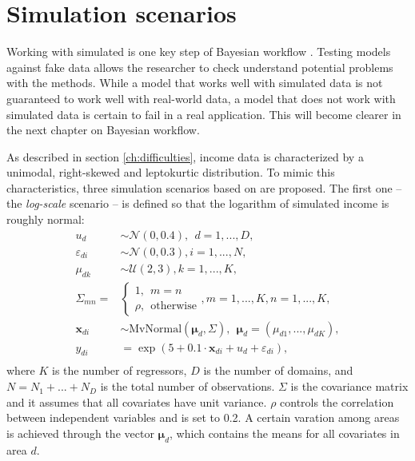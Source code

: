 \section{Simulation scenarios}
\label{ch:simulations}
Working with simulated is one key step of Bayesian workflow \cite{gelman_bayesian_2020}.
Testing models against fake data allows the researcher to check understand potential problems with the methods.
While a model that works well with simulated data is not guaranteed to work well with real-world data,
a model that does not work with simulated data is certain to fail in a real application.
This will become clearer in the next chapter on Bayesian workflow.

As described in section \ref{ch:difficulties}, income data is characterized by a unimodal, right-skewed and leptokurtic distribution.
To mimic this characteristics, three simulation scenarios based on \cite{rojas_perilla_data_2020} are proposed.
The first one – the \textit{log-scale} scenario – is defined so that the logarithm of simulated income is roughly normal:
\begin{equation}
    \begin{split}
        u_d & \sim \mathcal N(0, 0.4), ~~ d = 1,...,D,\\
        \varepsilon_{di} & \sim \mathcal{N}(0, 0.3), i = 1,...,N,\\
        \mu_{dk} & \sim \mathcal{U}(2, 3), k = 1,...,K,\\
        \Sigma_{mn} = &\begin{cases} 1, ~~ m = n \\ \rho,  ~~ \text{otherwise}  \end{cases},
            m = 1,...,K, n = 1,...,K,\\
        \boldsymbol x_{di}  &\sim \text{MvNormal} (\boldsymbol \mu_{d}, \Sigma) ,
            ~~ \boldsymbol \mu_{d} = (\mu_{d1}, ..., \mu_{dK}),\\
        y_{di} & = \exp(5 + 0.1 \cdot \boldsymbol x_{di}  + u_d + \varepsilon_{di}),\\
    \end{split}
    \label{eq:log_scenario}
\end{equation}
where $K$ is the number of regressors, $D$ is the number of domains, and $N = N_1 + ... + N_D$ is the total number of observations.
$\Sigma$ is the covariance matrix and it assumes that all covariates have unit variance. $\rho$ controls the correlation between independent variables and is set to 0.2.
A certain varation among areas is achieved through the vector $\boldsymbol \mu_d$, which contains the means for all covariates in area $d$.
